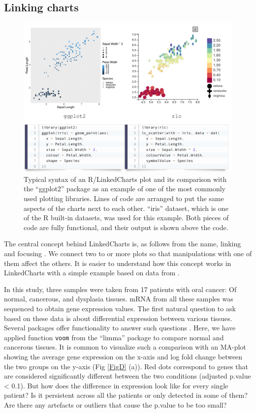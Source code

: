 \documentclass[twocolumn,10pt]{article}
\begin{document}
\subsection{Linking charts}

\begin{figure}[t]
	\includegraphics[width=\textwidth]{FigB/figB.png}
	\caption{Typical syntax of an R/LinkedCharts plot and its comparison with the ``ggplot2'' \citep{wickham_2016} package as an example of one of the most commonly used plotting libraries. Lines of code are arranged to put the same aspects of the charts next to each other. ``iris'' dataset, which is one of the R built-in datasets, was used for this example. Both pieces of code are fully functional, and their output is shown above the code.}
	\label{FigB}
\end{figure}

The central concept behind LinkedCharts is, as follows from the name, linking and focusing \citep{buja_1991}. We connect two to or more plots so that manipulations with one of them affect the others. It is easier to understand how this concept works in LinkedCharts with a simple example based on data from \citet{conway_2015}.

In this study, three samples were taken from 17 patients with oral cancer: Of normal, cancerous, and dysplasia tissues. mRNA from all these samples was sequenced to obtain gene expression values. The first natural question to ask based on these data is about differential expression between various tissues. Several packages offer functionality to answer such questions  \citep{ritchie_2015, love_2014}. Here, we have applied function \texttt{voom} from the ``limma'' package to compare normal and cancerous tissues. It is common to visualize such a comparison with an MA-plot \citep{dudoit_2002} showing the average gene expression on the x-axis and log fold change between the two groups on the y-axis (Fig \ref{FigD} (a)). Red dots correspond to genes that are considered significantly different between the two conditions (adjusted p.value < 0.1). But how does the difference in expression look like for every single patient? Is it persistent across all the patients or only detected in some of them? Are there any artefacts or outliers that cause the p.value to be too small?
\end{document}

